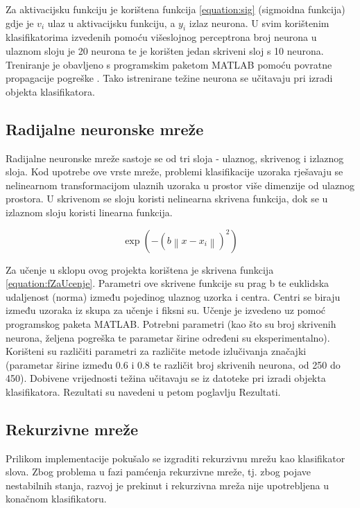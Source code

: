 \documentclass[a4paper,twocolumn,dvipdfm]{article}
\begin{document}
Za aktivacijsku funkciju je korištena funkcija \ref{equation:sig} (sigmoidna
funkcija) gdje je $v_i$ ulaz u aktivacijsku funkciju, a $y_i$ izlaz neurona. U
svim korištenim klasifikatorima izvedenih pomoću višeslojnog perceptrona broj
neurona u ulaznom sloju je 20 neurona te je korišten jedan skriveni sloj s 10
neurona. Treniranje je obavljeno s programskim paketom MATLAB pomoću povratne
propagacije pogreške \cite{rumelhart1986learning}. Tako istrenirane težine
neurona se učitavaju pri izradi objekta klasifikatora.

\subsection{Radijalne neuronske mreže}
Radijalne neuronske mreže sastoje se od tri sloja - ulaznog, skrivenog i
izlaznog sloja. Kod upotrebe ove vrste mreže, problemi klasifikacije uzoraka
rješavaju se nelinearnom transformacijom ulaznih uzoraka u prostor više
dimenzije od ulaznog prostora. U skrivenom se sloju koristi nelinearna skrivena
funkcija, dok se u izlaznom sloju koristi linearna funkcija.

\begin{equation}
\exp(-\left (b \left \| x - x_{i} \right \|  \right )^{2})
\label{equation:fZaUcenje}
\end{equation}

Za učenje u sklopu ovog projekta korištena je skrivena funkcija
\ref{equation:fZaUcenje}. Parametri ove skrivene funkcije su prag b te euklidska
udaljenost (norma) između pojedinog ulaznog uzorka i centra. Centri se biraju
između uzoraka iz skupa za učenje i fiksni su. Učenje je izvedeno uz pomoć
programskog paketa MATLAB. Potrebni parametri (kao što su broj skrivenih
neurona, željena pogreška te parametar širine određeni su eksperimentalno).
Korišteni su različiti parametri za  različite metode izlučivanja značajki
(parametar širine između 0.6 i 0.8 te različit broj skrivenih neurona, od 250 do
450). Dobivene vrijednosti težina učitavaju se iz datoteke pri izradi objekta
klasifikatora. Rezultati su navedeni u petom poglavlju Rezultati.

\subsection{Rekurzivne mreže}
Prilikom implementacije pokušalo se izgraditi rekurzivnu mrežu kao klasifikator slova. 
Zbog problema u fazi pamćenja rekurzivne mreže, tj. zbog pojave nestabilnih stanja, 
razvoj je prekinut i rekurzivna mreža nije upotrebljena u konačnom klasifikatoru.
\end{document}
